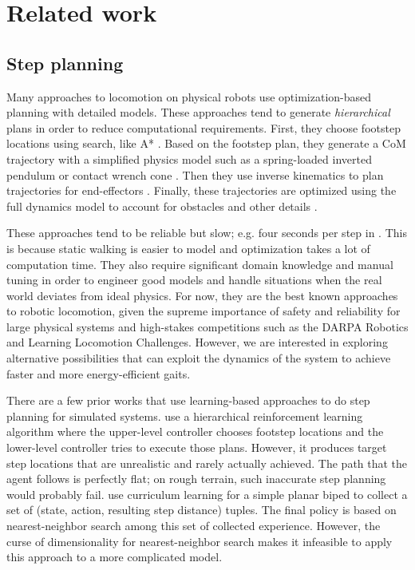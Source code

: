 \documentclass[conference]{IEEEtran}
\newcommand{\nhatch}[1]{{\leavevmode\color{magenta} Nathan: #1}}
\begin{document}
\section{Related work}

\subsection{Step planning}

Many approaches to locomotion on physical robots use optimization-based planning with detailed models.
These approaches tend to generate \emph{hierarchical} plans in order to reduce computational requirements.
First, they choose footstep locations using search, like A* \citep{huang2013step}.
Based on the footstep plan, they generate a CoM trajectory with a simplified physics model such as a spring-loaded inverted pendulum \citep{mordatch2010robust} or contact wrench cone \citep{dai2016planning}.
Then they use inverse kinematics to plan trajectories for end-effectors \citep{zucker2010optimization}.
Finally, these trajectories are optimized using the full dynamics model to account for obstacles and other details \citep{ratliff2009chomp}.

These approaches tend to be reliable but slow; e.g. four seconds per step in \citet{feng2015optimization}.
This is because static walking is easier to model and optimization takes a lot of computation time.
They also require significant domain knowledge and manual tuning in order to engineer good models and handle situations when the real world deviates from ideal physics.
For now, they are the best known approaches to robotic locomotion, given the supreme importance of safety and reliability for large physical systems and high-stakes competitions such as the DARPA Robotics and Learning Locomotion Challenges.
However, we are interested in exploring alternative possibilities that can exploit the dynamics of the system to achieve faster and more energy-efficient gaits.


There are a few prior works that use learning-based approaches to do step planning for simulated systems.
\cite{peng2017deeploco} use a hierarchical reinforcement learning algorithm where the upper-level controller chooses footstep locations and the lower-level controller tries to execute those plans.
However, it produces target step locations that are unrealistic and rarely actually achieved.
The path that the agent follows is perfectly flat; on rough terrain, such inaccurate step planning would probably fail.
\cite{karpathy2012curriculum} use curriculum learning for a simple planar biped to collect a set of (state, action, resulting step distance) tuples.
The final policy is based on nearest-neighbor search among this set of collected experience.
However, the curse of dimensionality for nearest-neighbor search
makes it infeasible to apply this approach to a more complicated model.
\end{document}
